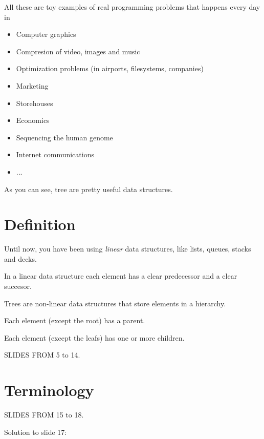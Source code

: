 \documentclass[a4paper, 9pt]{extarticle}
\newcommand{\separator}{\begin{center}%
\noindent\makebox[\linewidth]{\rule{0.75\paperwidth}{0.4pt}}%
\end{center}}
\begin{document}
\separator

All these are toy examples of real programming problems that happens every day in

\begin{itemize}
  \item Computer graphics
  \item Compresion of video, images and music
  \item Optimization problems (in airports, filesystems, companies)
  \item Marketing
  \item Storehouses
  \item Economics
  \item Sequencing the human genome
  \item Internet communications
  \item ...
\end{itemize}

As you can see, tree are pretty useful data structures.


\section{Definition}

Until now, you have been using \emph{linear} data structures, like lists, queues, stacks and decks.

In a linear data structure each element has a clear predecessor and a clear succesor.

Trees are non-linear data structures that store elements in a hierarchy.

Each element (except the root) has a parent.

Each element (except the leafs) has one or more children.

SLIDES FROM 5 to 14.



\section{Terminology}

SLIDES FROM 15 to 18.

Solution to slide 17:
\end{document}

